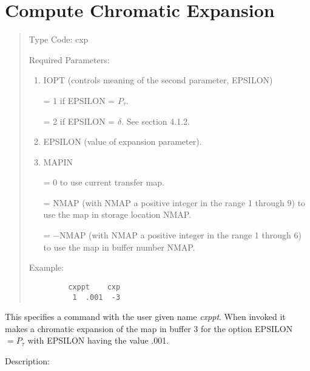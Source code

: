 \section{Compute Chromatic Expansion} 
\begin{quotation}
\noindent Type Code:  cxp
\vspace{5mm}

\noindent Required Parameters:
\begin{enumerate}
        \item  IOPT (controls meaning of the second parameter, EPSILON)

             = 1 if EPSILON = $P_\tau$.

             = 2 if EPSILON = $\delta$.  See section 4.1.2.

      \item  EPSILON (value of expansion parameter).

      \item  MAPIN

           = 0 to use current transfer map.

           = NMAP (with NMAP a positive integer in the range 1 through 9) to use the map in storage location NMAP.

           = $-$NMAP (with NMAP a positive integer in the range 1 through 6) to use the map in buffer number NMAP.
 \end{enumerate}

\vspace{5mm}
\noindent     Example:
\begin{verbatim}
         cxppt    cxp
          1  .001  -3
\end{verbatim}
\end{quotation}
This specifies a command with the user given name {\em cxppt}.  When invoked it makes a chromatic expansion of the map in buffer 3 for the option EPSILON  $= P_{\tau}$ with EPSILON having the value .001.

\vspace{5mm}
     Description:
\vspace{2mm}

